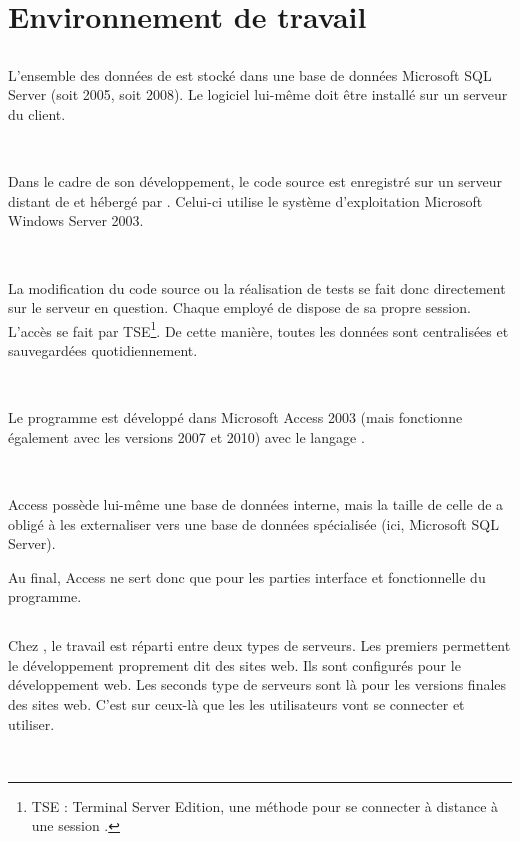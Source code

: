 \chapter{Environnement de travail}
\section{\solulog}
L'ensemble des données de \integrale{} est stocké dans une base de données Microsoft SQL Server (soit 2005, soit 2008). Le logiciel lui-même doit être installé sur un serveur du client.

~

Dans le cadre de son développement, le code source est enregistré sur un serveur distant de \solulog{} et hébergé par \fidit. Celui-ci utilise le système d'exploitation Microsoft Windows Server 2003.

~

La modification du code source ou la réalisation de tests se fait donc directement sur le serveur en question. Chaque employé de \solulog{} dispose de sa propre session. L'accès se fait par TSE\footnote{TSE : Terminal Server Edition, une méthode pour se connecter à distance à une session .}. De cette manière, toutes les données sont centralisées et sauvegardées quotidiennement.

~

Le programme \integrale{} est développé dans Microsoft Access 2003 (mais fonctionne également avec les versions 2007 et 2010) avec le langage \vb.

~

Access possède lui-même une base de données interne, mais la taille de celle de \integrale{} a obligé \solulog{} à les externaliser vers une base de données spécialisée (ici, Microsoft SQL Server).

Au final, Access ne sert donc que pour les parties interface et fonctionnelle du programme.

\section{\fidit}
Chez \fidit, le travail est réparti entre deux types de serveurs. Les premiers permettent le développement proprement dit des sites web. Ils sont configurés pour le développement web. Les seconds type de serveurs sont là pour les versions finales des sites web. C'est sur ceux-là que les les utilisateurs vont se connecter et utiliser.

~

